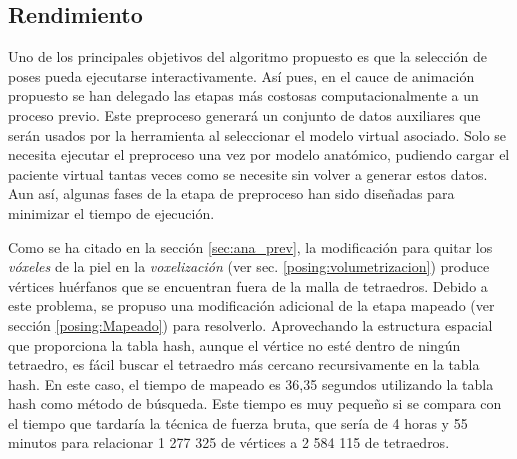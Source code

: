 \clearpage


\subsection{Rendimiento}
\label{sec:rendimiento}

Uno de los principales objetivos del algoritmo propuesto es que la selección de poses pueda ejecutarse interactivamente. Así pues, en el cauce de animación propuesto se han delegado las etapas más costosas computacionalmente a un proceso previo. Este preproceso generará un conjunto de datos auxiliares que serán usados por la herramienta al seleccionar el modelo virtual asociado. Solo se necesita ejecutar el preproceso una vez por modelo anatómico, %
pudiendo cargar el paciente virtual tantas veces como se necesite sin volver a generar estos datos. Aun así, algunas fases de la etapa de preproceso han sido diseñadas para minimizar el tiempo de ejecución.


Como se ha citado en la sección \ref{sec:ana_prev}, la modificación para quitar los \emph{vóxeles} de la piel en la \emph{voxelización} (ver sec. \ref{posing:volumetrizacion}) produce vértices huérfanos que se encuentran fuera de la malla de tetraedros.
Debido a este problema, se propuso una modificación adicional de la etapa mapeado (ver sección \ref{posing:Mapeado}) para resolverlo. Aprovechando la estructura espacial que proporciona la \ac{tabla hash}, aunque el vértice no esté dentro de ningún tetraedro, es fácil buscar el tetraedro más cercano recursivamente en la \ac{tabla hash}. 
En este caso, el tiempo de mapeado es 36,35 segundos utilizando la \ac{tabla hash} como método de búsqueda. Este tiempo es muy pequeño si se compara con el tiempo que tardaría  la técnica de fuerza bruta, que sería de 4 horas y 55 minutos para relacionar 1 277 325 de vértices a 2 584 115 de tetraedros. %

